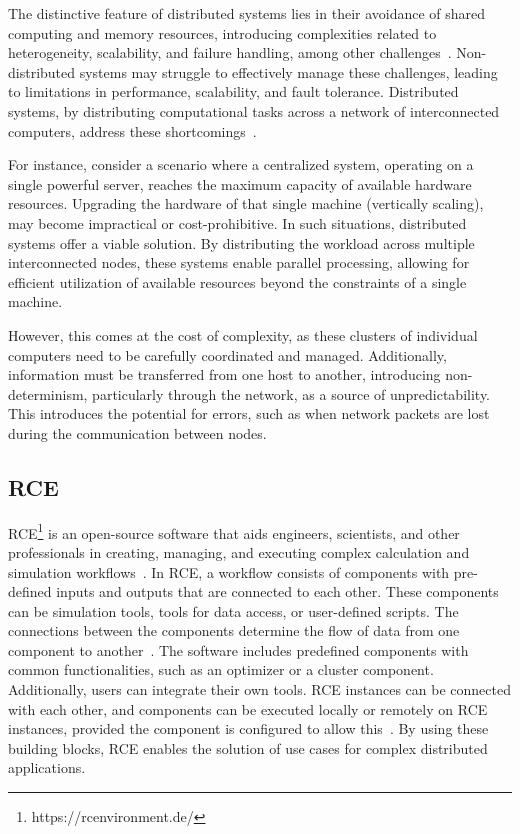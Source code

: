 The distinctive feature of distributed systems lies in their avoidance of shared computing and memory resources, introducing complexities related to heterogeneity, scalability, and failure handling, among other challenges~\cite{coulouris2005distributed}. Non-distributed systems may struggle to effectively manage these challenges, leading to limitations in performance, scalability, and fault tolerance. Distributed systems, by distributing computational tasks across a network of interconnected computers, address these shortcomings~\cite{coulouris2005distributed}.

For instance, consider a scenario where a centralized system, operating on a single powerful server, reaches the maximum capacity of available hardware resources. Upgrading the hardware of that single machine (vertically scaling), may become impractical or cost-prohibitive. In such situations, distributed systems offer a viable solution. By distributing the workload across multiple interconnected nodes, these systems enable parallel processing, allowing for efficient utilization of available resources beyond the constraints of a single machine. 

However, this comes at the cost of complexity, as these clusters of individual computers need to be carefully coordinated and managed. Additionally, information must be transferred from one host to another, introducing non-determinism, particularly through the network, as a source of unpredictability. This introduces the potential for errors, such as when network packets are lost during the communication between nodes.

\subsection{\acl{RCE}}
\label{subsec:rce}
\acf{RCE}\footnote{https://rcenvironment.de/} is an open-source software that aids engineers, scientists, and other professionals in creating, managing, and executing complex calculation and simulation workflows~\cite{BODEN2021100759,rceDevGuide10x}. In RCE, a workflow consists of components with pre-defined inputs and outputs that are connected to each other. These components can be simulation tools, tools for data access, or user-defined scripts. The connections between the components determine the flow of data from one component to another~\cite{BODEN2021100759,rceDevGuide10x}. The software includes predefined components with common functionalities, such as an optimizer or a cluster component. Additionally, users can integrate their own tools. RCE instances can be connected with each other, and components can be executed locally or remotely on RCE instances, provided the component is configured to allow this~\cite{BODEN2021100759,rceDevGuide10x}. By using these building blocks, RCE enables the solution of use cases for complex distributed applications.

